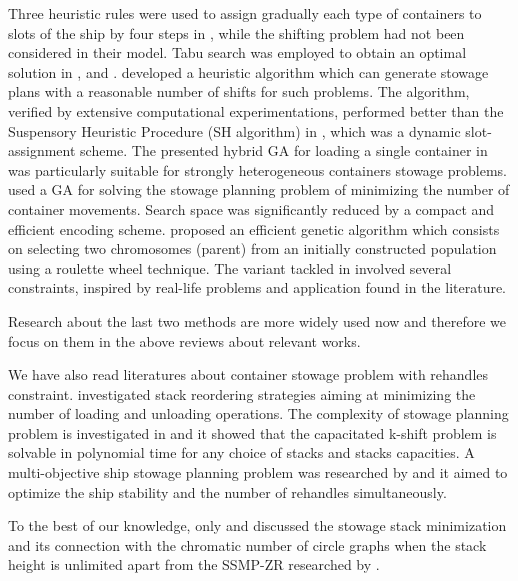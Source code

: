 \documentclass[review,3p,times,authoryear,12pt]{elsarticle}
\begin{document}
Three heuristic rules were used to assign gradually each type of containers to slots of the ship by four steps in \cite{scott1978loading}, while the shifting problem had not been considered in their model.
Tabu search was employed to obtain an optimal solution in \cite{wilson2001container}, \cite{bortfeldt2003parallel} and \cite{monaco2014terminal}.
\cite{ding2015stowage} developed a heuristic algorithm which can generate stowage plans with a reasonable number of shifts for such problems.
The algorithm, verified by extensive computational experimentations, performed better than the Suspensory Heuristic Procedure (SH algorithm) in \cite{avriel1998stowage}, which was a dynamic slot-assignment scheme.
The presented hybrid GA for loading a single container in \cite{bortfeldt2001hybrid} was particularly suitable for strongly heterogeneous containers stowage problems.
\cite{dubrovsky2002genetic}  used a GA for solving the stowage planning problem of minimizing the number of container movements.
Search space was significantly reduced by a compact and efficient encoding scheme.
\cite{kammarti2009evolutionary} proposed an efficient genetic algorithm which consists on selecting two chromosomes (parent) from an initially constructed population using a roulette wheel technique.
The variant tackled in \cite{cohen2017container} involved several constraints, inspired by real-life problems and application found in the literature.

Research about the last two methods are more widely used now and therefore we focus on them in the above reviews about relevant works.

We have also read literatures about container stowage problem with rehandles constraint.
\cite{malucelli2008stack} investigated stack reordering strategies aiming at minimizing the number of loading and unloading operations.
The complexity of stowage planning problem is investigated in \cite{tierney2014complexity} and it showed that the capacitated k-shift problem is solvable in polynomial time for any choice of stacks and stacks capacities.
A multi-objective ship stowage planning problem was researched by \cite{zhang2016multiobjective} and it aimed to optimize the ship stability and the number of rehandles simultaneously.

To the best of our knowledge, only \cite{avriel2000container} and \cite{jensen2010complexity} discussed the stowage stack minimization and its connection with the chromatic number of circle graphs when the stack height is unlimited apart from the SSMP-ZR researched by \cite{wang2014stowage}.
\end{document}
